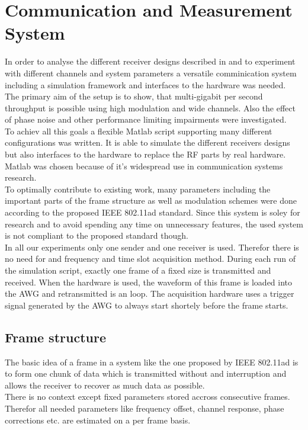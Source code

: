 \chapter{Communication and Measurement System}
In order to analyse the different receiver designs described in
 and to experiment with different channels
and system parameters a versatile comminication system
including a simulation framework and interfaces to the hardware
was needed. \\

The primary aim of the setup is to show, that multi-gigabit per second
throughput is possible using high modulation and wide channels.
Also the effect of phase noise and other performance limiting impairments
were investigated. \\

To achiev all this goals a flexible Matlab script supporting
many different configurations was written. It is able to simulate
the different receivers designs but also interfaces to the hardware
to replace the \gls{RF} parts by real hardware. Matlab was chosen
because of it's widespread use in communication systems research. \\

To optimally contribute to existing work, many parameters including
the important parts of the frame structure as well as modulation
schemes were done according to the proposed IEEE 802.11ad standard.
Since this system is soley for research and to avoid spending any
time on unnecessary features, the used system is not compliant to the
proposed standard though. \\

In all our experiments only one sender and one receiver is used.
Therefor there is no need for and frequency and time slot acquisition
method. During each run of the simulation script, exactly one frame
of a fixed size is transmitted and received.
When the hardware is used, the waveform of this frame is loaded into
the \gls{AWG} and retransmitted is an loop.
The acquisition hardware uses a trigger signal generated by the \gls{AWG}
to always start shortely before the frame starts.

\section{Frame structure}
\label{sec:sys_frame_struct}
The basic idea of a frame in a system like the one proposed by
IEEE 802.11ad is to form one chunk of data which is transmitted without
and interruption and allows the receiver to recover as much data as
possible. \\
There is no context except fixed parameters stored accross consecutive
frames. Therefor all needed parameters like frequency offset, channel
response, phase corrections etc. are estimated on a per frame basis. \\

